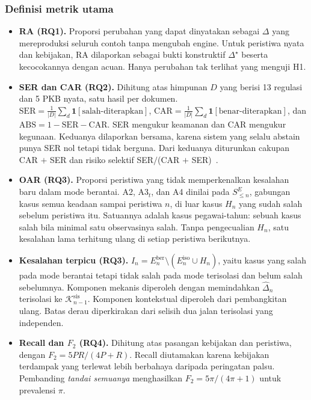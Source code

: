 \documentclass[journal,a4paper]{IEEEtran}
\makeatletter
\DeclareRobustCommand{\en}[1]{{\usefont{\f@encoding}{\f@family}{\f@series}{it}#1\/}}
\newcommand{\K}{\mathcal{K}}
\newcommand{\emas}{\star}
\newcommand{\SE}{S^{E}}
\makeatother
\begin{document}
\subsubsection{Definisi metrik utama}
\begin{itemize}[leftmargin=*,nosep]
  \item \textbf{RA (RQ1).} Proporsi perubahan yang dapat dinyatakan sebagai $\Delta$ yang mereproduksi seluruh contoh tanpa mengubah \en{engine}. Untuk peristiwa nyata dan kebijakan, RA dilaporkan sebagai bukti konstruktif $\Delta^{\emas}$ beserta kecocokannya dengan acuan. Hanya perubahan tak terlihat yang menguji H1.
  \item \textbf{SER dan CAR (RQ2).} Dihitung atas himpunan $D$ yang berisi 13 regulasi dan 5 PKB nyata, satu hasil per dokumen. $\mathrm{SER} = \frac{1}{|D|}\sum_{d} \mathbf{1}[\text{salah-diterapkan}]$, $\mathrm{CAR} = \frac{1}{|D|}\sum_{d} \mathbf{1}[\text{benar-diterapkan}]$, dan $\mathrm{ABS} = 1 - \mathrm{SER} - \mathrm{CAR}$. SER mengukur keamanan dan CAR mengukur kegunaan. Keduanya dilaporkan bersama, karena sistem yang selalu \en{abstain} punya SER nol tetapi tidak berguna. Dari keduanya diturunkan cakupan CAR $+$ SER dan risiko selektif SER$/$(CAR $+$ SER)~\cite{xin2021abstention}.
  \item \textbf{OAR (RQ3).} Proporsi peristiwa yang tidak memperkenalkan kesalahan baru dalam mode berantai. A2, A3$_t$, dan A4 dinilai pada $\SE_{\leq n}$, gabungan kasus semua keadaan sampai peristiwa $n$, di luar kasus $H_n$ yang sudah salah sebelum peristiwa itu. Satuannya adalah kasus pegawai-tahun: sebuah kasus salah bila minimal satu observasinya salah. Tanpa pengecualian $H_n$, satu kesalahan lama terhitung ulang di setiap peristiwa berikutnya.
  \item \textbf{Kesalahan terpicu (RQ3).} $I_n = E^{\mathrm{ber}}_n \setminus (E^{\mathrm{iso}}_n \cup H_n)$, yaitu kasus yang salah pada mode berantai tetapi tidak salah pada mode terisolasi dan belum salah sebelumnya. Komponen mekanis diperoleh dengan memindahkan $\hat{\Delta}_n$ terisolasi ke $\K^{\mathrm{sis}}_{n-1}$. Komponen kontekstual diperoleh dari pembangkitan ulang. Batas derau diperkirakan dari selisih dua jalan terisolasi yang independen.
  \item \textbf{\en{Recall} dan $F_2$ (RQ4).} Dihitung atas pasangan kebijakan dan peristiwa, dengan $F_2 = 5PR/(4P+R)$. \en{Recall} diutamakan karena kebijakan terdampak yang terlewat lebih berbahaya daripada peringatan palsu. Pembanding \emph{tandai semuanya} menghasilkan $F_2 = 5\pi/(4\pi+1)$ untuk prevalensi $\pi$.
\end{itemize}
\end{document}
